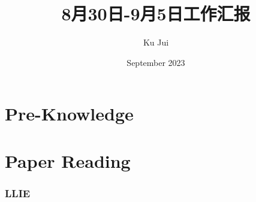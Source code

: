 \documentclass[letterpaper,10pt]{article}
\begin{document}
	
	
	\title{\songti {}8月30日-9月5日工作汇报}
	\author{\textrm{Ku Jui}}
	\date{\textrm{September 2023}}
	\maketitle
	
	\renewcommand{\figurename}{Figure} %
	\renewcommand{\contentsname}{Contents}
	\renewcommand{\tablename}{Table}
	\tableofcontents  %
	
	\part{Pre-Knowledge}	

	
	

	
	\part{Paper Reading}
	
	\section{LLIE}
	
\end{document}
